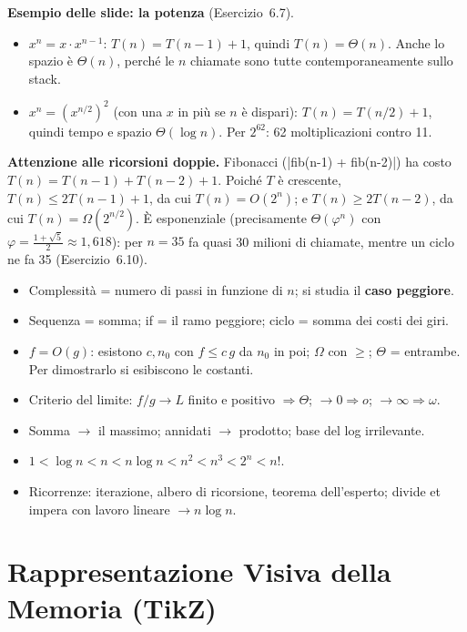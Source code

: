 \textbf{Esempio delle slide: la potenza} (Esercizio~6.7).
\begin{itemize}
  \item $x^n = x \cdot x^{n-1}$: $T(n) = T(n-1) + 1$, quindi $T(n) = \Theta(n)$. Anche
        lo spazio è $\Theta(n)$, perché le $n$ chiamate sono tutte contemporaneamente
        sullo stack.
  \item $x^n = (x^{n/2})^2$ (con una $x$ in più se $n$ è dispari): $T(n) = T(n/2) + 1$,
        quindi tempo e spazio $\Theta(\log n)$. Per $2^{62}$: 62 moltiplicazioni contro 11.
\end{itemize}

\textbf{Attenzione alle ricorsioni doppie.} Fibonacci 
(\cc|fib(n-1) + fib(n-2)|) ha costo $T(n) = T(n-1) + T(n-2) + 1$. Poiché $T$ è
crescente, $T(n) \le 2T(n-1) + 1$, da cui $T(n) = O(2^n)$; e
$T(n) \ge 2T(n-2)$, da cui $T(n) = \Omega(2^{n/2})$. È esponenziale (precisamente
$\Theta(\varphi^n)$ con $\varphi = \frac{1+\sqrt5}{2} \approx 1{,}618$): per $n = 35$
fa quasi 30 milioni di chiamate, mentre un ciclo ne fa 35 (Esercizio~6.10).

\begin{inparole}
\begin{itemize}
  \item Complessità = numero di passi in funzione di $n$; si studia il
        \textbf{caso peggiore}.
  \item Sequenza = somma; if = il ramo peggiore; ciclo = somma dei costi dei giri.
  \item $f = O(g)$: esistono $c, n_0$ con $f \le c\,g$ da $n_0$ in poi; $\Omega$ con
        $\ge$; $\Theta$ = entrambe. Per dimostrarlo si esibiscono le costanti.
  \item Criterio del limite: $f/g \to L$ finito e positivo $\Rightarrow \Theta$;
        $\to 0 \Rightarrow o$; $\to \infty \Rightarrow \omega$.
  \item Somma $\to$ il massimo; annidati $\to$ prodotto; base del log irrilevante.
  \item $1 < \log n < n < n\log n < n^2 < n^3 < 2^n < n!$.
  \item Ricorrenze: iterazione, albero di ricorsione, teorema dell'esperto; divide et
        impera con lavoro lineare $\to n \log n$.
\end{itemize}
\end{inparole}

\section{Rappresentazione Visiva della Memoria (TikZ)}


